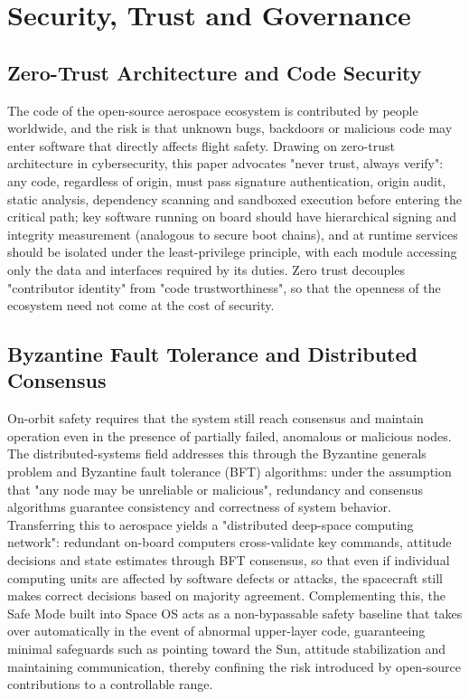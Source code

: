\documentclass[11pt]{article}
\begin{document}
\section{Security, Trust and Governance}
\subsection{Zero-Trust Architecture and Code Security}
The code of the open-source aerospace ecosystem is contributed by people worldwide, and the risk is that unknown bugs, backdoors or malicious code may enter software that directly affects flight safety. Drawing on zero-trust architecture in cybersecurity, this paper advocates "never trust, always verify": any code, regardless of origin, must pass signature authentication, origin audit, static analysis, dependency scanning and sandboxed execution before entering the critical path; key software running on board should have hierarchical signing and integrity measurement (analogous to secure boot chains), and at runtime services should be isolated under the least-privilege principle, with each module accessing only the data and interfaces required by its duties. Zero trust decouples "contributor identity" from "code trustworthiness", so that the openness of the ecosystem need not come at the cost of security.

\subsection{Byzantine Fault Tolerance and Distributed Consensus}
On-orbit safety requires that the system still reach consensus and maintain operation even in the presence of partially failed, anomalous or malicious nodes. The distributed-systems field addresses this through the Byzantine generals problem and Byzantine fault tolerance (BFT) algorithms: under the assumption that "any node may be unreliable or malicious", redundancy and consensus algorithms guarantee consistency and correctness of system behavior. Transferring this to aerospace yields a "distributed deep-space computing network": redundant on-board computers cross-validate key commands, attitude decisions and state estimates through BFT consensus, so that even if individual computing units are affected by software defects or attacks, the spacecraft still makes correct decisions based on majority agreement. Complementing this, the Safe Mode built into Space OS acts as a non-bypassable safety baseline that takes over automatically in the event of abnormal upper-layer code, guaranteeing minimal safeguards such as pointing toward the Sun, attitude stabilization and maintaining communication, thereby confining the risk introduced by open-source contributions to a controllable range.
\end{document}
